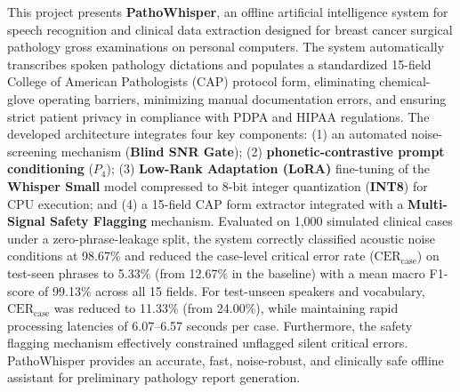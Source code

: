 This project presents \textbf{PathoWhisper}, an offline artificial intelligence system for speech recognition and clinical data extraction designed for breast cancer surgical pathology gross examinations on personal computers. The system automatically transcribes spoken pathology dictations and populates a standardized 15-field College of American Pathologists (CAP) protocol form, eliminating chemical-glove operating barriers, minimizing manual documentation errors, and ensuring strict patient privacy in compliance with PDPA and HIPAA regulations. The developed architecture integrates four key components: (1) an automated noise-screening mechanism (\textbf{Blind SNR Gate}); (2) \textbf{phonetic-contrastive prompt conditioning} ($P_4$); (3) \textbf{Low-Rank Adaptation (LoRA)} fine-tuning of the \textbf{Whisper Small} model compressed to 8-bit integer quantization (\textbf{INT8}) for CPU execution; and (4) a 15-field CAP form extractor integrated with a \textbf{Multi-Signal Safety Flagging} mechanism. Evaluated on 1,000 simulated clinical cases under a zero-phrase-leakage split, the system correctly classified acoustic noise conditions at 98.67\% and reduced the case-level critical error rate ($\text{CER}_{\text{case}}$) on test-seen phrases to 5.33\% (from 12.67\% in the baseline) with a mean macro F1-score of 99.13\% across all 15 fields. For test-unseen speakers and vocabulary, $\text{CER}_{\text{case}}$ was reduced to 11.33\% (from 24.00\%), while maintaining rapid processing latencies of 6.07--6.57 seconds per case. Furthermore, the safety flagging mechanism effectively constrained unflagged silent critical errors. PathoWhisper provides an accurate, fast, noise-robust, and clinically safe offline assistant for preliminary pathology report generation.
